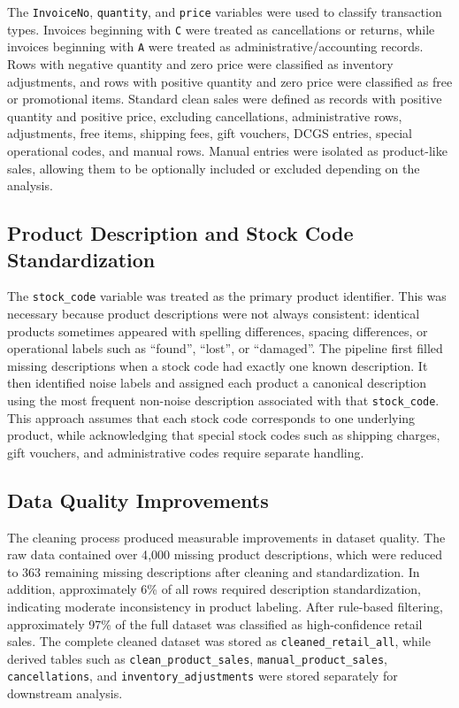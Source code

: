 \documentclass[10pt,a4paper]{article}
\begin{document}
The \texttt{InvoiceNo}, \texttt{quantity}, and \texttt{price} variables were used to classify transaction types. Invoices beginning with \texttt{C} were treated as cancellations or returns, while invoices beginning with \texttt{A} were treated as administrative/accounting records. Rows with negative quantity and zero price were classified as inventory adjustments, and rows with positive quantity and zero price were classified as free or promotional items. Standard clean sales were defined as records with positive quantity and positive price, excluding cancellations, administrative rows, adjustments, free items, shipping fees, gift vouchers, DCGS entries, special operational codes, and manual rows. Manual entries were isolated as product-like sales, allowing them to be optionally included or excluded depending on the analysis.

\subsection{Product Description and Stock Code Standardization}

The \texttt{stock\_code} variable was treated as the primary product identifier. This was necessary because product descriptions were not always consistent: identical products sometimes appeared with spelling differences, spacing differences, or operational labels such as ``found'', ``lost'', or ``damaged''. The pipeline first filled missing descriptions when a stock code had exactly one known description. It then identified noise labels and assigned each product a canonical description using the most frequent non-noise description associated with that \texttt{stock\_code}. This approach assumes that each stock code corresponds to one underlying product, while acknowledging that special stock codes such as shipping charges, gift vouchers, and administrative codes require separate handling.

\subsection{Data Quality Improvements}

The cleaning process produced measurable improvements in dataset quality. The raw data contained over 4{,}000 missing product descriptions, which were reduced to 363 remaining missing descriptions after cleaning and standardization. In addition, approximately 6\% of all rows required description standardization, indicating moderate inconsistency in product labeling. After rule-based filtering, approximately 97\% of the full dataset was classified as high-confidence retail sales. The complete cleaned dataset was stored as \texttt{cleaned\_retail\_all}, while derived tables such as \texttt{clean\_product\_sales}, \texttt{manual\_product\_sales}, \texttt{cancellations}, and \texttt{inventory\_adjustments} were stored separately for downstream analysis.
\end{document}
